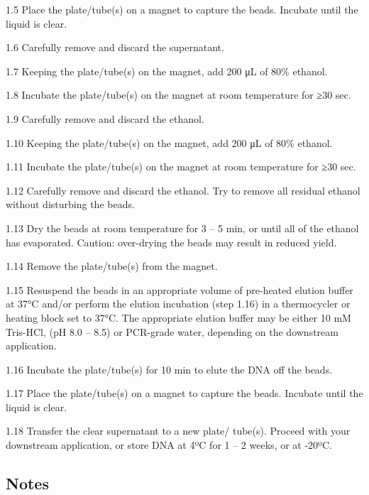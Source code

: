 \documentclass[
  letterpaper,
  DIV=11,
  numbers=noendperiod]{scrreprt}
\begin{document}
1.5 Place the plate/tube(s) on a magnet to capture the beads. Incubate
until the liquid is clear.

1.6 Carefully remove and discard the supernatant.

1.7 Keeping the plate/tube(s) on the magnet, add 200 μL of 80\% ethanol.

1.8 Incubate the plate/tube(s) on the magnet at room temperature for ≥30
sec.

1.9 Carefully remove and discard the ethanol.

1.10 Keeping the plate/tube(s) on the magnet, add 200 μL of 80\%
ethanol.

1.11 Incubate the plate/tube(s) on the magnet at room temperature for
≥30 sec.

1.12 Carefully remove and discard the ethanol. Try to remove all
residual ethanol without disturbing the beads.

1.13 Dry the beads at room temperature for 3 -- 5 min, or until all of
the ethanol has evaporated. Caution: over-drying the beads may result in
reduced yield.

1.14 Remove the plate/tube(s) from the magnet.

1.15 Resuspend the beads in an appropriate volume of pre-heated elution
buffer at 37°C and/or perform the elution incubation (step 1.16) in a
thermocycler or heating block set to 37°C. The appropriate elution
buffer may be either 10 mM Tris-HCl, (pH 8.0 -- 8.5) or PCR-grade water,
depending on the downstream application.

1.16 Incubate the plate/tube(s) for 10 min to elute the DNA off the
beads.

1.17 Place the plate/tube(s) on a magnet to capture the beads. Incubate
until the liquid is clear.

1.18 Transfer the clear supernatant to a new plate/ tube(s). Proceed
with your downstream application, or store DNA at 4ºC for 1 -- 2 weeks,
or at -20ºC.

\hypertarget{notes}{%
\subsection*{\texorpdfstring{\textbf{Notes}}{Notes}}\label{notes}}
\end{document}
